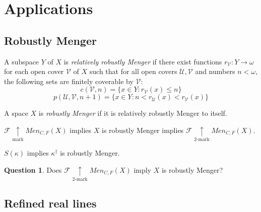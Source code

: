\documentclass{beamer}
\theoremstyle{example}
\theoremstyle{definition}
\newtheorem{question}[theorem]{Question}
\newcommand{\markwin}{\underset{\text{mark}}{\uparrow}}
\newcommand{\kmarkwin}[1]{\underset{#1\text{-mark}}{\uparrow}}
\newcommand{\oneptlind}[1]{#1^\dagger} %
\newcommand{\menGame}[1]{Men_{C,F}\left({#1}\right)}
\newcommand{\<}{\langle}
\renewcommand{\>}{\rangle}
\newcommand{\mc}[1]{\mathcal{#1}}
\newcommand{\alcompS}[1]{S(#1)}
\newcommand{\pl}[1]{\mathscr{#1}}
\newcommand{\term}{\textit}
\begin{document}
\section{Applications}

\subsection{Robustly Menger}

\begin{frame}
  \begin{definition}
    A subspace \(Y\) of \(X\) is \term{relatively robustly Menger}
    if there exist functions \(r_{\mc V}:Y\to\omega\)
    for each open cover \(\mc V\) of \(X\) such that
    for all open covers \(\mc U,\mc V\) and numbers \(n<\omega\),
    the following sets are finitely coverable by \(\mc V\):
      \[
        c(\mc V,n)=\{ x\in Y : r_{\mc V}(x)\leq n\}
      \]
      \[
        p(\mc U,\mc V,n+1)=\{ x\in Y : n<r_{\mc U}(x)<r_{\mc V}(x)\}
      \]
  \end{definition}

  \begin{definition}
    A space \(X\) is \term{robustly Menger} if it is relatively robustly
    Menger to itself.
  \end{definition}
\end{frame}

\begin{frame}
  \begin{theorem}
    \(\pl F\markwin\menGame{X}\) implies
    \(X\) is robustly Menger implies
    \(\pl F\kmarkwin{2}\menGame{X}\).
  \end{theorem}

  \pause

  \begin{theorem}
    $\alcompS\kappa$ implies $\oneptlind\kappa$ is robustly Menger.
  \end{theorem}

  \pause

  \begin{question}
    Does \(\pl F\kmarkwin{2}\menGame{X}\) imply
    \(X\) is robustly Menger?
  \end{question}
\end{frame}

\subsection{Refined real lines}
\end{document}
